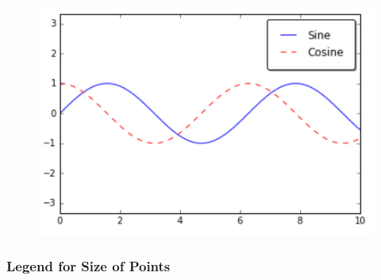 \documentclass[]{book}
\theoremstyle{definition}
\theoremstyle{definition}
\theoremstyle{definition}
\theoremstyle{remark}
\begin{document}
\begin{figure}
\centering
\includegraphics{images/legend3.png}
\caption{}
\end{figure}

\subsubsection{Legend for Size of
Points}\label{legend-for-size-of-points}
\end{document}
